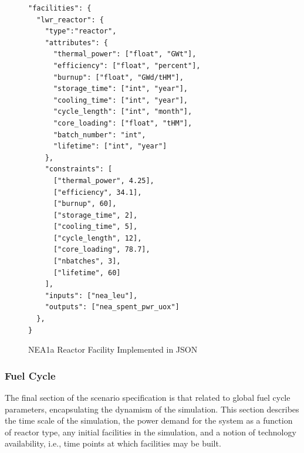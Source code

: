 \begin{figure}[h!]
\begin{Verbatim}[frame=single]
"facilities": {
  "lwr_reactor": {
    "type":"reactor",
    "attributes": {
      "thermal_power": ["float", "GWt"],
      "efficiency": ["float", "percent"],
      "burnup": ["float", "GWd/tHM"],
      "storage_time": ["int", "year"],
      "cooling_time": ["int", "year"],
      "cycle_length": ["int", "month"],
      "core_loading": ["float", "tHM"],
      "batch_number": "int",
      "lifetime": ["int", "year"]
    },
    "constraints": [
      ["thermal_power", 4.25],
      ["efficiency", 34.1],
      ["burnup", 60],
      ["storage_time", 2],
      ["cooling_time", 5],
      ["cycle_length", 12],
      ["core_loading", 78.7],
      ["nbatches", 3],
      ["lifetime", 60]
    ],
    "inputs": ["nea_leu"],
    "outputs": ["nea_spent_pwr_uox"]
  },
}
\end{Verbatim}
\caption{NEA1a Reactor Facility Implemented in JSON}
\label{fig:facility}
\end{figure}

\subsubsection{Fuel Cycle}
The final section of the scenario specification is that related to global fuel
cycle parameters, encapsulating the dynamism of the simulation. This section
describes the time scale of the simulation, the power demand for the system as a
function of reactor type, any initial facilities in the simulation, and a notion
of technology availability, i.e., time points at which facilities may be built.




